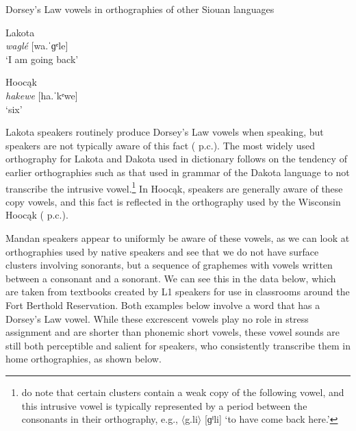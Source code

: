 \begin{exe}
\item\label{siouandorsey} Dorsey's Law vowels in orthographies of other Siouan languages

	\begin{xlist}
	\item\label{siouandorsey1} Lakota\\\textit{waglé} {[}wa.ˈɡᵉle] \\
	`I am going back' \citep[122]{ullrich2011}

	\item\label{siouandorsey2} Hoocąk\\ \textit{hakewe} {[}ha.ˈkᵉwe] \\
	`six' \citep[26]{miner1979}

	\end{xlist}

\end{exe}

Lakota speakers routinely produce Dorsey's Law vowels when speaking, but speakers are not typically aware of this fact (\citeauthor{mirzayan2010} p.c.). The most widely used orthography for Lakota and Dakota used in  dictionary follows on the tendency of earlier orthographies such as that used in  grammar of the Dakota language to not transcribe the intrusive vowel.\footnote{\citet[5]{boasdeloria1941} do note that certain clusters contain a weak copy of the following vowel, and this intrusive vowel is typically represented by a period between the consonants in their orthography, e.g., $\langle$g.li$\rangle$ [ɡⁱli] `to have come back here.'} In Hoocąk, speakers are generally aware of these copy vowels, and this fact is reflected in the orthography used by the Wisconsin Hoocąk (\citeauthor{lundquist2015} p.c.).

Mandan speakers appear to uniformly be aware of these vowels, as we can look at orthographies used by native speakers and see that we do not have surface clusters involving sonorants, but a sequence of graphemes with vowels written between a consonant and a sonorant. We can see this in the data below, which are taken from textbooks created by L1 speakers for use in classrooms around the Fort Berthold Reservation. Both examples below involve a word that has a Dorsey's Law vowel. While these excrescent vowels play no role in stress assignment and are shorter than phonemic short vowels, these vowel sounds are still both perceptible and salient for speakers, who consistently transcribe them in home orthographies, as shown below.


